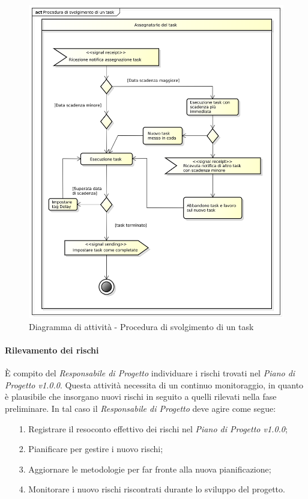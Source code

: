 \begin{figure}[htbp]
\centering
\includegraphics[scale=0.5]{immagini/procedura_di svolgimento_di_un_task.png}
\captionsetup{labelfont=bf}
\caption{Diagramma di attività - Procedura di svolgimento di un task}\label{sec:Figura7}
\end{figure}

\paragraph{Rilevamento dei rischi}
È compito del \textit{Responsabile di Progetto} individuare i rischi trovati nel \textit{Piano di Progetto v1.0.0}. Questa attività necessita di un continuo monitoraggio, in quanto è plausibile che insorgano nuovi rischi in seguito a quelli rilevati nella fase preliminare. In tal caso il \textit{Responsabile di Progetto} deve agire come segue:
\begin{itemize}
\item [1.] Registrare il resoconto effettivo dei rischi nel \textit{Piano di Progetto v1.0.0};
\item [2.] Pianificare per gestire i nuovo rischi;
\item [3.] Aggiornare le metodologie per far fronte alla nuova pianificazione;
\item [4.] Monitorare i nuovo rischi riscontrati durante lo sviluppo del progetto. 
\end{itemize}

